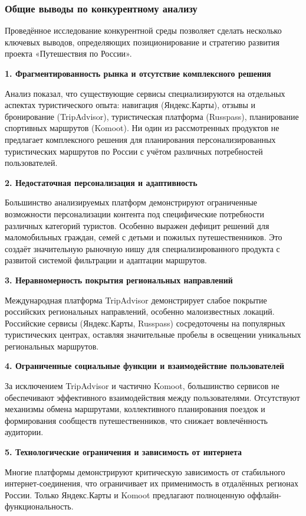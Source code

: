 \subsubsection*{Общие выводы по конкурентному анализу}

Проведённое исследование конкурентной среды позволяет сделать несколько ключевых выводов, определяющих позиционирование и стратегию развития проекта «Путешествия по России».

\textbf{1. Фрагментированность рынка и отсутствие комплексного решения}

Анализ показал, что существующие сервисы специализируются на отдельных аспектах туристического опыта: навигация (Яндекс.Карты), отзывы и бронирование (TripAdvisor), туристическая платформа (Russpass), планирование спортивных маршрутов (Komoot). Ни один из рассмотренных продуктов не предлагает комплексного решения для планирования персонализированных туристических маршрутов по России с учётом различных потребностей пользователей.

\textbf{2. Недостаточная персонализация и адаптивность}

Большинство анализируемых платформ демонстрируют ограниченные возможности персонализации контента под специфические потребности различных категорий туристов. Особенно выражен дефицит решений для маломобильных граждан, семей с детьми и пожилых путешественников. Это создаёт значительную рыночную нишу для специализированного продукта с развитой системой фильтрации и адаптации маршрутов.

\textbf{3. Неравномерность покрытия региональных направлений}

Международная платформа TripAdvisor демонстрирует слабое покрытие российских региональных направлений, особенно малоизвестных локаций. Российские сервисы (Яндекс.Карты, Russpass) сосредоточены на популярных туристических центрах, оставляя значительные пробелы в освещении уникальных региональных маршрутов.

\textbf{4. Ограниченные социальные функции и взаимодействие пользователей}

За исключением TripAdvisor и частично Komoot, большинство сервисов не обеспечивают эффективного взаимодействия между пользователями. Отсутствуют механизмы обмена маршрутами, коллективного планирования поездок и формирования сообществ путешественников, что снижает вовлечённость аудитории.

\textbf{5. Технологические ограничения и зависимость от интернета}

Многие платформы демонстрируют критическую зависимость от стабильного интернет-соединения, что ограничивает их применимость в отдалённых регионах России. Только Яндекс.Карты и Komoot предлагают полноценную оффлайн-функциональность.

